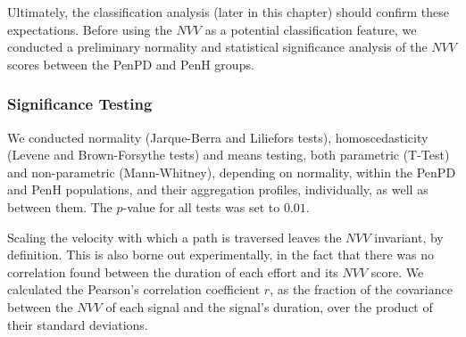 Ultimately, the classification analysis (later in this chapter) should confirm these expectations. Before using the $NVV$ as a potential classification feature, we conducted a preliminary normality and statistical significance analysis of the $NVV$ scores between the \gls{PenPD} and \gls{PenH} groups. 



\subsubsection{Significance Testing}
\label{subsubsec:PenCTSignificanceTesting}
We conducted normality (Jarque-Berra and Liliefors tests), homoscedasticity (Levene and Brown-Forsythe tests) and means testing, both parametric (T-Test) and non-parametric (Mann-Whitney), depending on normality, within the \gls{PenPD} and \gls{PenH} populations, and their aggregation profiles, individually, as well as between them. The $p$-value for all tests was set to $0.01$. 


Scaling the velocity with which a path is traversed leaves the $NVV$ invariant, by definition. This is also borne out experimentally, in the fact that there was no correlation found between the duration of each effort and its $NVV$ score. We calculated the Pearson's correlation coefficient $r$, as the fraction of the covariance between the $NVV$ of each signal and the signal's duration, over the product of their standard deviations. 

